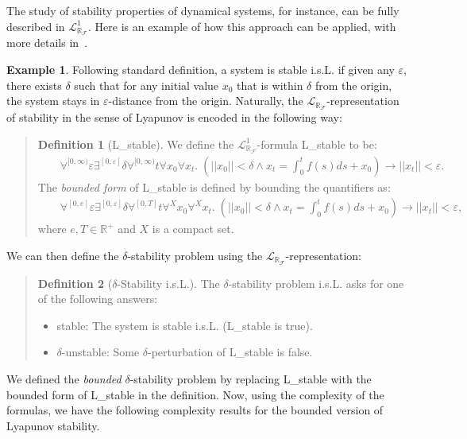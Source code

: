 \documentclass[10pt]{article}
\newcommand{\lrf}{\mathcal{L}_{\mathbb{R}_{\mathcal{F}}}}
\theoremstyle{definition}
\newtheorem{definition}{Definition}[section]
\newtheorem{example}{Example}[section]
\begin{document}
The study of stability properties of dynamical systems, for instance, can be fully described in $\lrf^1$. Here is an example of how this approach can be applied, with more details in~\cite{DBLP:journals/corr/GaoKC14}. 
\begin{example}
Following standard definition, a system is stable i.s.L. if given any $\varepsilon$, there exists $\delta$ such that for any initial value $x_0$ that is within $\delta$ from the origin, the system stays in $\varepsilon$-distance from the origin. Naturally, the $\lrf$-representation of stability in the sense of Lyapunov is encoded in the following way:
\begin{quote}
\vspace{-.5cm}
\begin{definition}[{\sf L\_stable}]
We define the $\lrf^1$-formula {\sf L\_stable} to be:
\begin{eqnarray*}
& &\forall^{[0,\infty)} \varepsilon\exists^{[0,\varepsilon]} \delta \forall^{[0,\infty)} t\forall x_0\forall x_t .\; (||x_0||<\delta \wedge x_t = \int_0^t f(s)ds + x_0 )\rightarrow ||x_t||<\varepsilon.
\end{eqnarray*}
The {\em bounded form} of {\sf L\_stable} is defined by bounding the quantifiers as:\begin{eqnarray*}
& &\forall^{[0, e]} \varepsilon\exists^{[0,\varepsilon]} \delta \forall^{[0,T]} t\forall^X x_0\forall^X x_t. \;(||x_0||<\delta \wedge x_t = \int_0^t f(s)ds + x_0 )\rightarrow ||x_t||<\varepsilon, 
\end{eqnarray*}
where $e, T\in \mathbb{R}^+$ and $X$ is a compact set.
\end{definition}
\end{quote}
We can then define the $\delta$-stability problem using the $\lrf$-representation:  
\begin{quote}
\vspace{-.5cm}
\begin{definition}[$\delta$-Stability i.s.L.]\label{sl}
The $\delta$-stability problem i.s.L. asks for one of the following answers:
\begin{itemize}
\item {\sf stable}: The system is stable i.s.L. ({\sf L\_stable} is true). 
\item {\sf $\delta$-unstable}: Some $\delta$-perturbation of {\sf L\_stable} is false. 
\end{itemize}
\end{definition}
\end{quote}
We defined the {\em bounded} $\delta$-stability problem by replacing {\sf L\_stable} with the bounded form of {\sf L\_stable} in the definition. Now, using the complexity of the formulas, we have the following complexity results for the bounded version of Lyapunov stability. 

\end{example}
\end{document}
